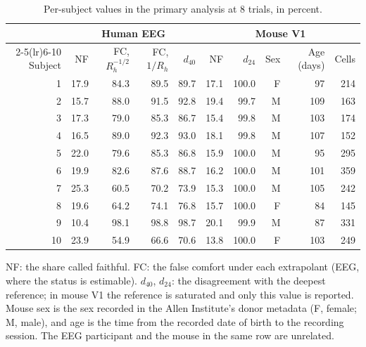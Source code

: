 \documentclass[11pt]{article}
\newcommand{\tablenote}[1]{\par\smallskip\noindent
  \begin{minipage}{\linewidth}\footnotesize\setlength{\parindent}{0pt}#1\end{minipage}}
\begin{document}
\begin{table}[!htb]
\centering\small
\caption{Per-subject values in the primary analysis at 8 trials, in percent.}
\begin{tabular}{rrrrrrrrrr}
\toprule
 & \multicolumn{4}{c}{Human EEG} & \multicolumn{5}{c}{Mouse V1} \\
\cmidrule(lr){2-5}\cmidrule(lr){6-10}
Subject & NF & FC, $R_h^{-1/2}$ & FC, $1/R_h$ & $d_{40}$ & NF & $d_{24}$ & Sex & Age (days) & Cells \\
\midrule
1 & 17.9 & 84.3 & 89.5 & 89.7 & 17.1 & 100.0 & F & 97 & 214 \\
2 & 15.7 & 88.0 & 91.5 & 92.8 & 19.4 & 99.7 & M & 109 & 163 \\
3 & 17.3 & 79.0 & 85.3 & 86.7 & 15.4 & 99.8 & M & 103 & 174 \\
4 & 16.5 & 89.0 & 92.3 & 93.0 & 18.1 & 99.8 & M & 107 & 152 \\
5 & 22.0 & 79.6 & 85.3 & 86.8 & 15.9 & 100.0 & M & 95 & 295 \\
6 & 19.9 & 82.6 & 87.6 & 88.7 & 16.2 & 100.0 & M & 101 & 359 \\
7 & 25.3 & 60.5 & 70.2 & 73.9 & 15.3 & 100.0 & M & 105 & 242 \\
8 & 19.6 & 64.2 & 74.1 & 76.8 & 15.7 & 100.0 & F & 84 & 145 \\
9 & 10.4 & 98.1 & 98.8 & 98.7 & 20.1 & 99.9 & M & 87 & 331 \\
10 & 23.9 & 54.9 & 66.6 & 70.6 & 13.8 & 100.0 & F & 103 & 249 \\
\bottomrule
\end{tabular}
\tablenote{NF: the share called faithful.
FC: the false comfort under each extrapolant (EEG, where the status is estimable).
$d_{40}$, $d_{24}$: the disagreement with the deepest reference; in mouse V1 the reference is saturated and only this value is reported.
Mouse sex is the sex recorded in the Allen Institute's donor metadata (F, female; M, male), and age is the time from the recorded date of birth to the recording session.
The EEG participant and the mouse in the same row are unrelated.}
\end{table}
\end{document}
